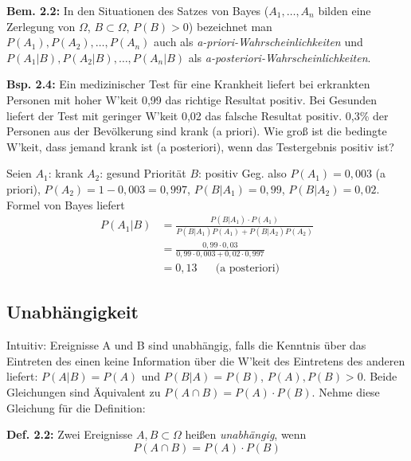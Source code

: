 \documentclass[a4paper,11pt]{article}
\begin{document}
\vspace{6pt}
\noindent\textbf{Bem. 2.2:} In den Situationen des Satzes von Bayes ($A_1,\dots,A_n$ bilden eine Zerlegung von $\Omega$, $B\subset\Omega$, $P(B)>0$)
bezeichnet man $P(A_1),P(A_2),\dots,P(A_n)$ auch als \textit{a-priori-Wahrscheinlichkeiten} und $P(A_1|B),P(A_2|B),\dots,P(A_n|B)$ als \textit{a-posteriori-Wahrscheinlichkeiten}.

\vspace{6pt}
\noindent\textbf{Bsp. 2.4:} Ein medizinischer Test für eine Krankheit liefert bei erkrankten Personen mit hoher W'keit 0,99 das richtige Resultat \glqq positiv\grqq. Bei Gesunden liefert der Test mit geringer W'keit 0,02 das falsche Resultat \glqq positiv\grqq. 
0,3\% der Personen aus der Bevölkerung sind krank (a priori). Wie groß ist die bedingte W'keit, dass jemand krank ist (a posteriori), wenn das Testergebnis positiv ist?

\noindent Seien
\newline $A_1$: \glqq krank\grqq
\newline $A_2$: \glqq gesund Priorität\grqq
\newline $B$: \glqq positiv\grqq
\newline Geg. also $P(A_1)=0,003$ (a priori), $P(A_2)=1-0,003=0,997$, $P(B|A_1)=0,99$, $P(B|A_2)=0,02$.
\newline Formel von Bayes liefert
\begin{align*}
P(A_1|B) &= \frac{P(B|A_1)\cdot P(A_1)}{P(B|A_1)P(A_1)+P(B|A_2)P(A_2)}\\
&= \frac{0,99\cdot0,03}{0,99\cdot0,003+0,02\cdot0,997}\\
&= 0,13 \hspace{20pt} \text{(a posteriori)}
\end{align*}

\subsection{Unabhängigkeit}
\noindent Intuitiv: Ereignisse A und B sind unabhängig, falls die Kenntnis über das Eintreten des einen keine Information über die W'keit des Eintretens des anderen liefert:
\newline $P(A|B)=P(A)$ und $P(B|A)=P(B)$, $P(A),P(B)>0$. Beide Gleichungen sind Äquivalent zu $P(A\cap B)=P(A)\cdot P(B)$. Nehme diese Gleichung für die Definition:

\vspace{6pt}
\noindent\textbf{Def. 2.2:} Zwei Ereignisse $A,B\subset\Omega$ heißen \textit{unabhängig}, wenn
\[P(A\cap B)=P(A)\cdot P(B)\]
\end{document}
